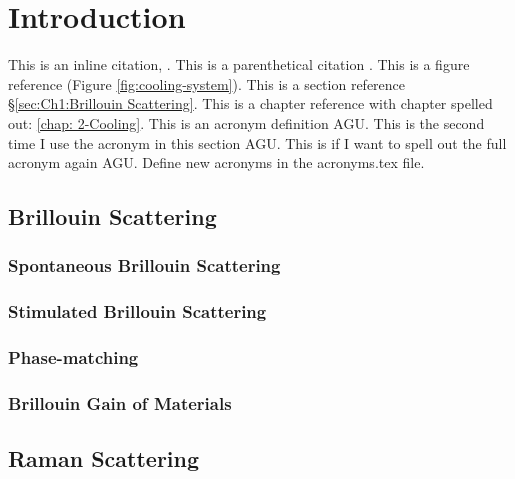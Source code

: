 \chapter{Introduction}
\label{ch:Introduction}
\acresetall

This is an inline citation, \cite{boyd2020nonlinear}. This is a parenthetical citation \citep{boyd2020nonlinear}. This is a figure reference (Figure \ref{fig:cooling-system}). This is a section reference \S\ref{sec:Ch1:Brillouin Scattering}. This is a chapter reference with chapter spelled out: \autoref{chap: 2-Cooling}. This is an acronym definition \ac{AGU}. This is the second time I use the acronym in this section \ac{AGU}. This is if I want to spell out the full acronym again \acf{AGU}. Define new acronyms in the acronyms.tex file.


\section{Brillouin Scattering}
\label{sec:Introduction:Brillouin}
\lipsum[1]

  \subsection{Spontaneous Brillouin Scattering}
  \label{subsec:Introduction:Brillouin:Spontaneous}
  \lipsum[1]

  \subsection{Stimulated Brillouin Scattering}
  \label{subsec:Introduction:Brillouin:Stimulated}
  \lipsum[1]

  \subsection{Phase-matching}
  \label{subsec:Introduction:Brillouin:Phase-matching}
  \lipsum[1]

  \subsection{Brillouin Gain of Materials}
  \label{subsec:Introduction:Brillouin:Gain}

\section{Raman Scattering}
\label{sec:Introduction:Raman}
\lipsum[1]
